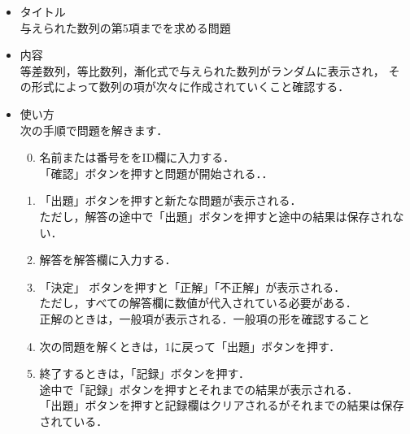 \documentclass[20]{jarticle}
\begin{document}
\begin{itemize}
\item タイトル\\
与えられた数列の第5項までを求める問題
\item 内容\\
等差数列，等比数列，漸化式で与えられた数列がランダムに表示され，
その形式によって数列の項が次々に作成されていくこと確認する．

\item 使い方\\
次の手順で問題を解きます．
\begin{enumerate}
\setcounter{enumi}{-1}
\item 名前または番号ををID欄に入力する．\vspace{1mm}\\
「確認」ボタンを押すと問題が開始される．．\vspace{1mm}
\item 「出題」ボタンを押すと新たな問題が表示される．\vspace{1mm}\\
ただし，解答の途中で「出題」ボタンを押すと途中の結果は保存されない．\vspace{1mm}
\item 解答を解答欄に入力する．\vspace{1mm}
\item 「決定」 ボタンを押すと「正解」「不正解」が表示される．\\[1mm]
ただし，すべての解答欄に数値が代入されている必要がある．\\[1mm]
正解のときは，一般項が表示される．一般項の形を確認すること\vspace{1mm}
\item 次の問題を解くときは，1に戻って「出題」ボタンを押す．\vspace{1mm}
\item 終了するときは，「記録」ボタンを押す．\\[1mm]
途中で「記録」ボタンを押すとそれまでの結果が表示される．\\[1mm]
「出題」ボタンを押すと記録欄はクリアされるがそれまでの結果は保存されている．
\end{enumerate}

\end{itemize}
\end{document}
